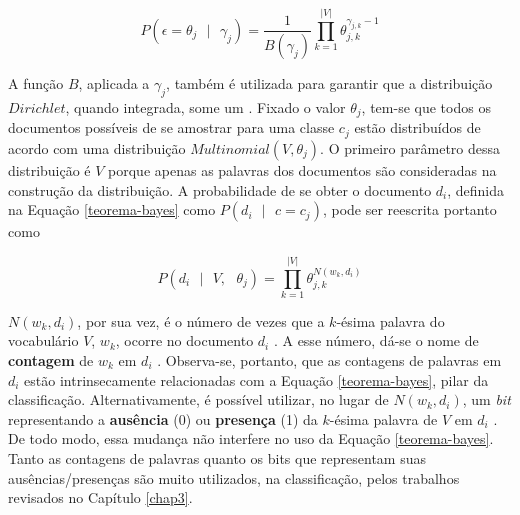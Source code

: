 \begin{equation}
\label{dirichlet}
  \ensuremath{P(\epsilon = \theta_j\mbox{ } |\mbox{ } \gamma_j) = \frac{1}{B(\gamma_j)}\prod_{k = 1}^{|V|}\theta_{j,k}^{\gamma_{j,k} - 1}}
\end{equation}

A função \ensuremath{B}, aplicada a \ensuremath{\gamma_j}, também é utilizada para garantir que a distribuição \ensuremath{Dirichlet}, quando integrada, some um \cite{stat-distribs}. Fixado o valor \ensuremath{\theta_j}, tem-se que todos os documentos possíveis de se amostrar para uma classe \ensuremath{c_j} estão distribuídos de acordo com uma distribuição \ensuremath{Multinomial(V, \theta_j)}. O primeiro parâmetro dessa distribuição é \ensuremath{V} porque apenas as palavras dos documentos são consideradas na construção da distribuição. A probabilidade de se obter o documento \ensuremath{d_i}, definida na Equação \ref{teorema-bayes} como \ensuremath{P(d_i\mbox{ }|\mbox{ }c = c_j)}, pode ser reescrita portanto como \cite{resnik}

\begin{equation}
\label{multinomial}
\ensuremath{P(d_i\mbox{ } |\mbox{ } V,\mbox{ } \theta_j)  = \prod_{k = 1}^{|V|}\theta_{j,k}^{N(w_k, d_i)}}
\end{equation}

\ensuremath{N(w_k, d_i)}, por sua vez, é o número de vezes que a \ensuremath{k}-ésima palavra do vocabulário \ensuremath{V}, \ensuremath{w_k}, ocorre no documento \ensuremath{d_i} \cite{resnik}. A esse número, dá-se o nome de \textbf{contagem} de \ensuremath{w_k} em \ensuremath{d_i} \cite{nigam}. Observa-se, portanto, que as contagens de palavras em \ensuremath{d_i} estão intrinsecamente relacionadas com a Equação \ref{teorema-bayes}, pilar da classificação. Alternativamente, é possível utilizar, no lugar de \ensuremath{N(w_k, d_i)}, um \emph{bit} representando a \textbf{ausência} (0) ou \textbf{presença} (1) da \ensuremath{k}-ésima palavra de \ensuremath{V} em \ensuremath{d_i} \cite{mccallum-nigam}. De todo modo, essa mudança não interfere no uso da Equação \ref{teorema-bayes}. Tanto as contagens de palavras quanto os bits que representam suas ausências/presenças são muito utilizados, na classificação, pelos trabalhos revisados no Capítulo \ref{chap3}.

